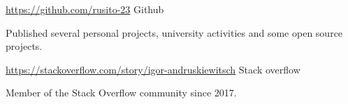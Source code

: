 \documentclass[10pt, a4paper]{resume}
\begin{document}

\begin{cventries}

  \cventry
    {\href{https://github.com/rusito-23}{https://github.com/rusito-23}}
    {Github}
    {}
    {}
    {
      \begin{cvitems}
      \item {Published several personal projects, university activities and some open source projects.}
      \end{cvitems}
    }

  \cventry
    {\href{https://stackoverflow.com/story/igor-andruskiewitsch}{https://stackoverflow.com/story/igor-andruskiewitsch}}
    {Stack overflow}
    {}
    {}
    {
      \begin{cvitems}
        \item {Member of the Stack Overflow community since 2017.}
      \end{cvitems}
    }

\end{cventries}


\end{document}
